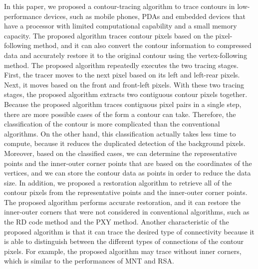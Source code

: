 \documentclass[sensors,article,accept,moreauthors,pdftex,10pt,a4paper]{mdpi}
\begin{document}
In this paper, we proposed a contour-tracing algorithm to trace contours in low-performance devices, such as mobile phones, PDAs and embedded devices that have a processor with limited computational capability and a small memory capacity. The proposed algorithm traces contour pixels based on the pixel-following method, and it can also convert the contour information to compressed data and accurately restore it to the original contour using the vertex-following method. The proposed algorithm repeatedly executes the two tracing stages. First, the tracer moves to the next pixel based on its left and left-rear pixels. Next, it moves based on the front and front-left pixels. With these two tracing stages, the proposed algorithm extracts two contiguous contour pixels together. Because the proposed algorithm traces contiguous pixel pairs in a single step, there are more possible cases of the form a contour can take. Therefore, the classification of the contour is more complicated than the conventional algorithms. On the other hand, this classification actually takes less time to compute, because it reduces the duplicated detection of the background pixels. Moreover, based on the classified cases, we can determine the representative points and the inner-outer corner points that are based on the coordinates of the vertices, and we can store the contour data as points in order to reduce the data size. In addition, we proposed a restoration algorithm to retrieve all of the contour pixels from the representative points and the inner-outer corner points. The proposed algorithm performs accurate restoration, and it can restore the inner-outer corners that were not considered in conventional algorithms, such as the RD code method and the PXY method. Another characteristic of the proposed algorithm is that it can trace the desired type of connectivity because it is able to distinguish between the different types of connections of the contour pixels. For example, the proposed algorithm may trace without inner corners, which is similar to the performances of MNT and RSA.

\end{document}
